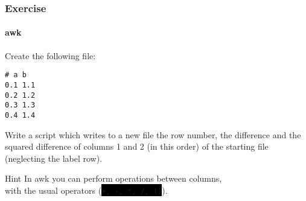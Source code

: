 \documentclass[unknownkeysallowed, 10pt, a4 paper, handout]{beamer}
\newcommand{\code}[1]{\colorbox{black}{\color{green}\texttt{#1}}}
\begin{document}
\begin{frame}[fragile=singleslide]
  \frametitle{Exercise}
  \framesubtitle{awk}

  \begin{block}{Create the following file:}
    \begin{verbatim}
# a b
0.1 1.1
0.2 1.2
0.3 1.3
0.4 1.4
    \end{verbatim}
  \end{block}

  \begin{exampleblock}{}
    Write a script which writes to a new file the row number, the difference
      and the squared difference of columns 1 and 2 (in this order) of the
      starting file (neglecting the label row).
  \end{exampleblock}

  \begin{alertblock}{Hint}
    In awk you can perform operations between columns,\\
    with the usual operators (\code{+, -, *, /, ()}).
  \end{alertblock}
\end{frame}
\end{document}
